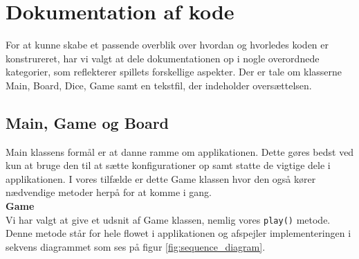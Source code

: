 \section{Dokumentation af kode}

\noindent For at kunne skabe et passende overblik over hvordan og hvorledes koden er konstrureret, har vi valgt at dele dokumentationen op i nogle overordnede kategorier, som reflekterer spillets forskellige aspekter.
Der er tale om klasserne Main, Board, Dice, Game samt en tekstfil, der indeholder oversættelsen.


\subsection{Main, Game og Board}
Main klassens formål er at danne ramme om applikationen.
Dette gøres bedst ved kun at bruge den til at sætte konfigurationer op samt statte de vigtige dele i applikationen.
I vores tilfælde er dette Game klassen hvor den også kører nædvendige metoder herpå for at komme i gang.
\\

\noindent\textbf{Game} \\
Vi har valgt at give et udsnit af Game klassen, nemlig vores \lstinline{play()} metode.
Denne metode står for hele flowet i applikationen og afspejler implementeringen i sekvens diagrammet som ses på figur \ref{fig:sequence_diagram}.

